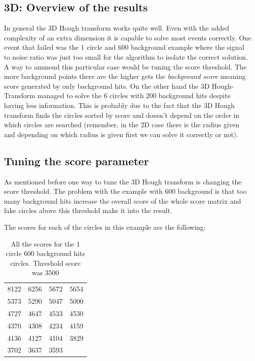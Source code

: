 \documentclass[11pt,twoside]{scrreprt}
\begin{document}
\subsection{3D: Overview of the results} %
\label{ssub:3d_overview_of_the_results}

In general the 3D Hough transform works quite well. Even with the added complexity of an extra dimension it is capable to solve most
events correctly. One event that failed was the 1 circle and 600 background example where the signal to noise ratio was just too small
for the algorithm to isolate the correct solution. A way to ammend this particular case would be tuning the score threshold. The more background
points there are the higher gets the \emph{background score} meaning score generated by only background hits. On the other hand the 3D Hough-
Transform managed to solve the 6 circles with 200 background hits despite having less information. This is probably due to the fact that 
the 3D Hough transform finds the circles sorted by score and doesn't depend on the order in which circles are searched (remember, in the 
2D case there is the radius given and depending on which radius is given first we can solve it correctly or not).


\subsection{Tuning the score parameter} %
\label{ssub:tuning_background_score}
As mentioned before one way to tune the 3D Hough transform is changing the score threshold. The problem with the example with 600 background
is that too many background hits increase the overall score of the whole score matrix and fake circles above this threshold make it into 
the result.

The scores for each of the circles in this example are the following:
\begin{table}[ht]
\centering
\caption{All the scores for the 1 circle 600 background hits circles. Threshold score was 3500}
\begin{tabular}{c|c|c|c}
\toprule
8122 & 6256 & 5672 & 5654 \\
5373 & 5290 & 5047 & 5000 \\
4727 & 4647 & 4533 & 4530 \\
4370 & 4308 & 4234 & 4159 \\
4136 & 4127 & 4104 & 3829  \\
3702 & 3637 & 3593 \\
\bottomrule
\end{tabular}
\end{table}
\end{document}

